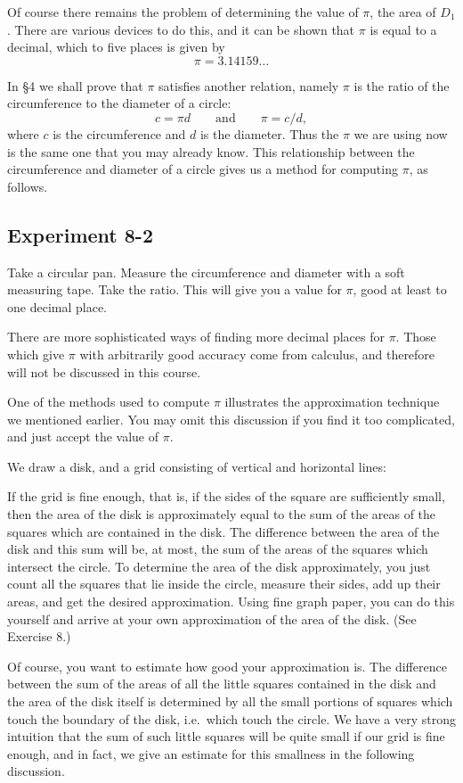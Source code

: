 \documentclass[12pt]{book} %
\begin{document}
Of course there remains the problem of determining the value of $\pi$, the area of $D_1$. There are various devices to do this, and it can be shown that $\pi$ is equal to a decimal, which to five places is given by
\[
\pi=3.14159\ldots
\]

In \S4 we shall prove that $\pi$ satisfies another relation, namely $\pi$ is the ratio of the circumference to the diameter of a circle:
\[
c=\pi d
\qquad \text{and} \qquad
\pi=c/d,
\]
where $c$ is the circumference and $d$ is the diameter. Thus the $\pi$ we are using now is the same one that you may already know. This relationship between the circumference and diameter of a circle gives us a method for computing $\pi$, as follows.

\subsection*{Experiment 8-2}

Take a circular pan. Measure the circumference and diameter with a soft measuring tape. Take the ratio. This will give you a value for $\pi$, good at least to one decimal place.

There are more sophisticated ways of finding more decimal places for $\pi$. Those which give $\pi$ with arbitrarily good accuracy come from calculus, and therefore will not be discussed in this course.

One of the methods used to compute $\pi$ illustrates the approximation technique we mentioned earlier. You may omit this discussion if you find it too complicated, and just accept the value of $\pi$.

We draw a disk, and a grid consisting of vertical and horizontal lines:


If the grid is fine enough, that is, if the sides of the square are sufficiently small, then the area of the disk is approximately equal to the sum of the areas of the squares which are contained in the disk. The difference between the area of the disk and this sum will be, at most, the sum of the areas of the squares which intersect the circle. To determine the area of the disk approximately, you just count all the squares that lie inside the circle, measure their sides, add up their areas, and get the desired approximation. Using fine graph paper, you can do this yourself and arrive at your own approximation of the area of the disk. (See Exercise 8.)

Of course, you want to estimate how good your approximation is. The difference between the sum of the areas of all the little squares contained in the disk and the area of the disk itself is determined by all the small portions of squares which touch the boundary of the disk, i.e.\ which touch the circle. We have a very strong intuition that the sum of such little squares will be quite small if our grid is fine enough, and in fact, we give an estimate for this smallness in the following discussion.
\end{document}
